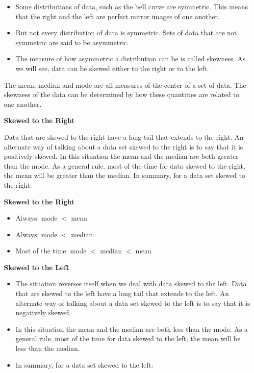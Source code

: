 \begin{itemize}
\item Some distributions of data, such as the bell curve are symmetric. This means that the right and the left are perfect mirror images of one another. 
\item But not every distribution of data is symmetric. Sets of data that are not symmetric are said to be asymmetric. 
\item The measure of how asymmetric a distribution can be is called skewness. As we will see, data can be skewed either to the right or to the left.
\end{itemize}




The mean, median and mode are all measures of the center of a set of data. The skewness of the data can be determined by how these quantities are related to one another.




\textbf{Skewed to the Right}

Data that are skewed to the right have a long tail that extends to the right. An alternate way of talking about a data set skewed to the right is to say that it is positively skewed. In this situation the mean and the median are both greater than the mode. As a general rule, most of the time for data skewed to the right, the mean will be greater than the median. In summary, for a data set skewed to the right:


\noindent \textbf{Skewed to the Right}
\begin{itemize}
\item Always: mode $<$ mean
\item Always: mode $<$ median
\item Most of the time: mode $<$ median $<$ mean

\end{itemize}



\noindent \textbf{Skewed to the Left}
\begin{itemize}
\item The situation reverses itself when we deal with data skewed to the left. Data that are skewed to the left have a long tail that extends to the left. An alternate way of talking about a data set skewed to the left is to say that it is negatively skewed. \item In this situation the mean and the median are both less than the mode. As a general rule, most of the time for data skewed to the left, the mean will be less than the median. \item In summary, for a data set skewed to the left:
\end{itemize}

